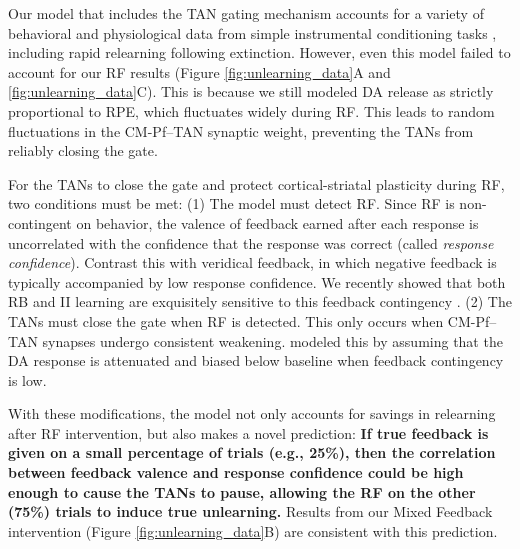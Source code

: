 \documentclass[apacite,draftfirst,man]{apa6}
\begin{document}
Our model that includes the TAN gating mechanism accounts for a variety of
behavioral and physiological data from simple instrumental conditioning tasks
\cite{AshbyCrossley2011, CrossleyEtAl2016}, including rapid relearning following
extinction. However, even this model failed to account for our RF results (Figure
\ref{fig:unlearning_data}A and \ref{fig:unlearning_data}C). This is because we
still modeled DA release as strictly proportional to RPE, which fluctuates
widely during RF. This leads to random fluctuations in the CM-Pf--TAN synaptic
weight, preventing the TANs from reliably closing the gate.

For the TANs to close the gate and protect cortical-striatal plasticity during
RF, two conditions must be met: (1) The model must detect RF. Since RF is
non-contingent on behavior, the valence of feedback earned after each response
is uncorrelated with the confidence that the response was correct (called
\textit{response confidence}). Contrast this with veridical feedback, in which
negative feedback is typically accompanied by low response confidence. We
recently showed that both RB and II learning are exquisitely sensitive to this
feedback contingency \cite{AshbyVucovich2016}. (2) The TANs must close the gate
when RF is detected. This only occurs when CM-Pf--TAN synapses undergo
consistent weakening.  modeled this by assuming
that the DA response is attenuated and biased below baseline when feedback
contingency is low.

With these modifications, the model not only accounts for savings in relearning
after RF intervention, but also makes a novel prediction: \textbf{If true
feedback is given on a small percentage of trials (e.g., 25\%), then the
correlation between feedback valence and response confidence could be high
enough to cause the TANs to pause, allowing the RF on the other (75\%) trials to
induce true unlearning.} Results from our Mixed Feedback intervention (Figure
\ref{fig:unlearning_data}B) are consistent with this prediction.
\end{document}
